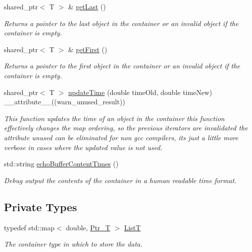 \begin{DoxyCompactItemize}
shared\-\_\-ptr$<$ T $>$ \& \hyperlink{classmsf__core_1_1SortedContainer_ada83f9baa4b17b5816975b1e67354ff1}{get\-Last} ()
\begin{DoxyCompactList}\small\item\em Returns a pointer to the last object in the container or an invalid object if the container is empty. \end{DoxyCompactList}\item 
shared\-\_\-ptr$<$ T $>$ \& \hyperlink{classmsf__core_1_1SortedContainer_a7cce297c5a4bbf80d617741fe3dc902e}{get\-First} ()
\begin{DoxyCompactList}\small\item\em Returns a pointer to the first object in the container or an invalid object if the container is empty. \end{DoxyCompactList}\item 
shared\-\_\-ptr$<$ T $>$ \hyperlink{classmsf__core_1_1SortedContainer_a7e4c594bb1aec9d6d4d8fb73e7baff9a}{update\-Time} (double time\-Old, double time\-New) \-\_\-\-\_\-attribute\-\_\-\-\_\-((warn\-\_\-unused\-\_\-result))
\begin{DoxyCompactList}\small\item\em This function updates the time of an object in the container this function effectively changes the map ordering, so the previous iterators are invalidated the attribute unused can be eliminated for non gcc compilers, its just a little more verbose in cases where the updated value is not used. \end{DoxyCompactList}\item 
std\-::string \hyperlink{classmsf__core_1_1SortedContainer_a7cecf8583999a5b457e04d5ef781dc5d}{echo\-Buffer\-Content\-Times} ()
\begin{DoxyCompactList}\small\item\em Debug output the contents of the container in a human readable time format. \end{DoxyCompactList}\end{DoxyCompactItemize}
\subsection*{Private Types}
\begin{DoxyCompactItemize}
\item 
typedef std\-::map$<$ double, \hyperlink{classmsf__core_1_1SortedContainer_a0dd7e9676bf540e11f526a8ac16da06b}{Ptr\-\_\-\-T} $>$ \hyperlink{classmsf__core_1_1SortedContainer_abb7bb5ff6c1a1916b8c7e48a50953919}{List\-T}
\begin{DoxyCompactList}\small\item\em The container type in which to store the data. \end{DoxyCompactList}\end{DoxyCompactItemize}
